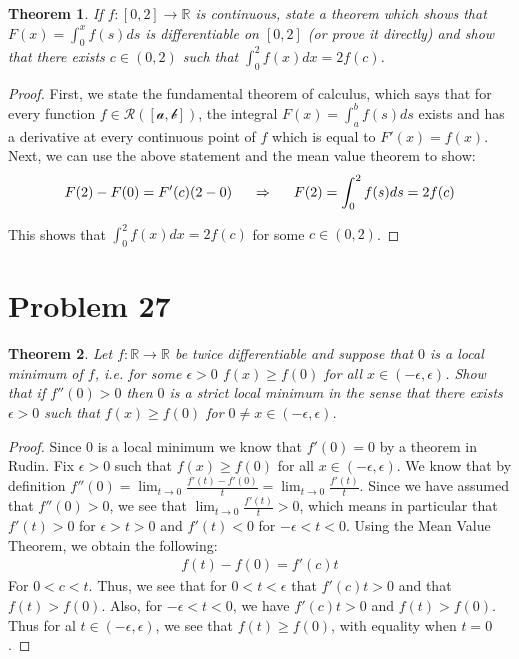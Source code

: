 \documentclass[psamsfonts]{amsart}
\newtheorem{thm}{Theorem}[section]
\theoremstyle{definition}
\theoremstyle{remark}
\numberwithin{equation}{section}
\begin{document}
\begin{thm}
If $f:[0,2] \to \mathbb{R}$ is continuous, state a theorem which shows that $F(x) = \int_0^x f(s) ds$ is differentiable on $[0,2]$ (or prove it directly) and show that there exists $c \in (0,2)$ such that $\int_0^2 f(x) dx = 2 f(c)$. 
\end{thm}

\begin{proof}
First, we state the fundamental theorem of calculus, which says that for every function $f \in \mathscr{R([a,b])}$, the integral $F(x) = \int_a^b f(s) ds$ exists and has a derivative at every continuous point of $f$ which is equal to $F'(x) = f(x)$. Next, we can use the above statement and the mean value theorem to show:
\begin{eqnarray}
F(2) - F(0) = F'(c) (2 - 0) \hspace{0.5cm} \Rightarrow \hspace{0.5cm} F(2) = \int_0^2 f(s) ds= 2 f(c)
\end{eqnarray} 

This shows that $\int_0^2 f(x) dx = 2 f(c)$ for some $c \in (0,2)$. 
\end{proof}

\section{Problem 27}

\begin{thm}
Let $f: \mathbb{R} \to \mathbb{R}$ be twice differentiable and suppose that $0$ is a local minimum of $f$, i.e. for some $\epsilon > 0$ $f(x) \geq f(0)$ for all $x \in (-\epsilon, \epsilon)$. Show that if $f''(0)>0$ then $0$ is a strict local minimum in the sense that there exists $\epsilon > 0$ such that $f(x) \geq f(0)$ for $0 \neq x \in (-\epsilon, \epsilon)$. 
\end{thm}

\begin{proof}
Since $0$ is a local minimum we know that $f'(0) = 0$ by a theorem in Rudin. Fix $\epsilon > 0$ such that $f(x) \geq f(0)$ for all $x \in (-\epsilon, \epsilon)$. We know that by definition $f''(0) = \lim_{t \to 0} \frac{f'(t) - f'(0)}{t} = \lim_{t \to 0} \frac{f'(t)}{t}$. Since we have assumed that $f''(0) > 0$, we see that $\lim_{t \to 0} \frac{f'(t)}{t} > 0$, which means in particular that $f'(t) > 0$ for $\epsilon > t > 0$ and $f'(t) < 0$ for $-\epsilon < t < 0$. Using the Mean Value Theorem, we obtain the following:
\begin{eqnarray}
f(t)- f(0) = f'(c) t
\end{eqnarray}
For $0 < c < t$. Thus, we see that for $0 < t < \epsilon$ that $f'(c)t > 0$ and that $f(t) > f(0)$. Also, for $-\epsilon < t < 0$, we have $f'(c)t > 0$ and $f(t) > f(0)$. Thus for al $t \in (-\epsilon, \epsilon)$, we see that $f(t) \geq f(0)$, with equality when $t = 0$. 
\end{proof}
\end{document}

